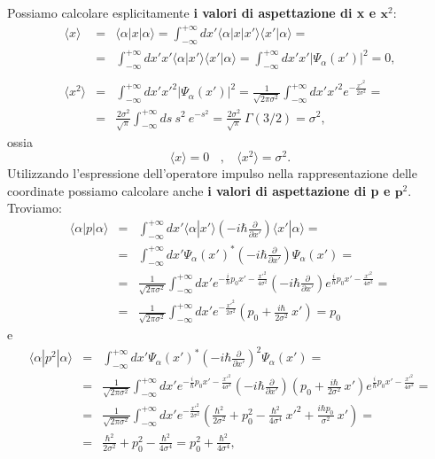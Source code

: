 Possiamo calcolare esplicitamente \textbf{i valori di aspettazione di x e $\mathbf x^2$}:
\begin{eqnarray}
\langle x \rangle &=& \langle \alpha | x | \alpha \rangle = \int_{-\infty}^{+\infty} dx' \langle \alpha | x | x' \rangle \langle x' | \alpha \rangle =  \nonumber \\
&=&  \int_{-\infty}^{+\infty} dx' x' \langle \alpha | x' \rangle \langle x' | \alpha \rangle = \int_{-\infty}^{+\infty} dx' x' |\Psi_\alpha (x')|^2 = 0,\\
\nonumber \\
\langle x^2 \rangle &=&  \int_{-\infty}^{+\infty} dx' x'^2 |\Psi_\alpha (x')|^2 = \frac{1}{\sqrt{2 \pi \sigma^2}} \int_{-\infty}^{+\infty} dx' x'^2 e^{- \frac{x'^2}{2 \sigma^2}} =\nonumber  \\
&=& \frac{2 \sigma^2}{\sqrt{\pi}} \int_{-\infty}^{+\infty} ds ~ s^2 ~e^{-s^2} = \frac{2 \sigma^2}{\sqrt{\pi}} ~ \Gamma(3/2) = \sigma^2,
\end{eqnarray}
ossia
\begin{equation}
\langle x \rangle = 0~~~~, ~~~~\langle x^2 \rangle = \sigma^2.
\end{equation}
Utilizzando l'espressione dell'operatore impulso nella rappresentazione delle coordinate possiamo calcolare anche \textbf{i valori di aspettazione di p e $\mathbf p^2$}. Troviamo:
\begin{eqnarray}
\langle \alpha | p | \alpha \rangle  &=&  \int_{-\infty}^{+\infty} dx' \langle \alpha | x' \rangle \left(-i \hbar \frac{\partial}{\partial x'} \right) \langle x' | \alpha \rangle = \nonumber\\
&=& \int_{-\infty}^{+\infty} dx' \Psi_\alpha(x')^* \left(-i \hbar \frac{\partial}{\partial x'} \right) \Psi_\alpha(x') = \nonumber \\
&=& \frac{1}{\sqrt{2 \pi \sigma^2}} \int_{-\infty}^{+\infty} dx' e^{-\frac{i}{\hbar}p_0 x' - \frac{x'^2}{4 \sigma^2}} \left(-i \hbar \frac{\partial}{\partial x'} \right) e^{\frac{i}{\hbar}p_0 x' - \frac{x'^2}{4 \sigma^2}} = \nonumber \\
&=& \frac{1}{\sqrt{2 \pi \sigma^2}} \int_{-\infty}^{+\infty} dx'  e^{- \frac{x'^2}{2 \sigma^2}} \left(p_0 + \frac{i \hbar}{2 \sigma^2} ~x' \right) = p_0
\end{eqnarray}
e
\begin{eqnarray}
\langle \alpha | p^2 | \alpha \rangle  &=& \int_{-\infty}^{+\infty} dx' \Psi_\alpha(x')^* \left(-i \hbar \frac{\partial}{\partial x'} \right)^2 \Psi_\alpha(x') = \nonumber \\
&=& \frac{1}{\sqrt{2 \pi \sigma^2}} \int_{-\infty}^{+\infty} dx' e^{-\frac{i}{\hbar}p_0 x' - \frac{x'^2}{4 \sigma^2}} \left(-i \hbar \frac{\partial}{\partial x'} \right)\left(p_0 + \frac{i \hbar}{2 \sigma^2} ~x' \right) e^{\frac{i}{\hbar}p_0 x' - \frac{x'^2}{4 \sigma^2}} = \nonumber \\
&=& \frac{1}{\sqrt{2 \pi \sigma^2}} \int_{-\infty}^{+\infty} dx'  e^{- \frac{x'^2}{2 \sigma^2}} \left(\frac{\hbar^2}{2 \sigma^2} + p_0^2 - \frac{\hbar^2}{4 \sigma^4}~x'^2 + \frac{i \hbar p_0}{\sigma^2}~x' \right) = \nonumber \\
&=& \frac{\hbar^2}{2 \sigma^2} + p_0^2 - \frac{\hbar^2}{4 \sigma^4} = p_0^2 + \frac{\hbar^2}{4 \sigma^4},
\end{eqnarray}
